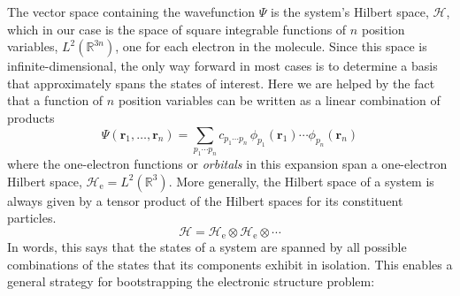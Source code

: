 The vector space containing the wavefunction \(\Psi\) is the system's Hilbert
space, \(\mathcal{H}\), which in our case is the space of square integrable
functions of \(n\) position variables,
\(
    L^2(\mathbb{R}^{3n})
\),
one for each electron in the molecule.
Since this space is infinite-dimensional, the only way forward in most cases is
to determine a basis that approximately spans the states of interest.
Here we are helped by the fact that a function of \(n\) position variables can
be written as a linear combination of products
\begin{equation}
    \Psi(\mathbf{r}_1, \dots, \mathbf{r}_n)
    =
    \sum_{p_1\cdots p_n}
    c_{p_1\cdots p_n}\,
    \phi_{p_1}(\mathbf{r}_1)
    \cdots
    \phi_{p_n}(\mathbf{r}_n)
\end{equation}
where the one-electron functions or {\itshape orbitals} in this expansion span a
one-electron Hilbert space,
\(
    \mathcal{H}_\mathrm{e}
    =
    L^2(\mathbb{R}^3)
\).
More generally, the Hilbert space of a system is always given by a tensor
product of the Hilbert spaces for its constituent particles.
\begin{equation}
    \mathcal{H}
    =
    \mathcal{H}_\mathrm{e}
    \otimes
    \mathcal{H}_\mathrm{e}
    \otimes
    \cdots
\end{equation}
In words, this says that the states of a system are spanned by all possible
combinations of the states that its components exhibit in isolation.
This enables a general strategy for bootstrapping the electronic structure
problem:
